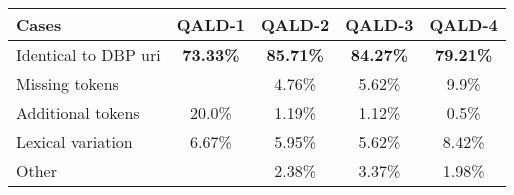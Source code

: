 {\centering
\begin{tabular}{l|c|c|c|c}
\textbf{Cases}  & \textbf{QALD-1} & \textbf{QALD-2} & \textbf{QALD-3} & \textbf{QALD-4} \\ \hline \hline
Identical to DBP uri   & \textbf{73.33\%}  & \textbf{85.71\%}  & \textbf{84.27\%}  & \textbf{79.21\%}  \\ \hline
Missing tokens         &                   & 4.76\%            & 5.62\%            & 9.9\%             \\ \hline
Additional tokens      & 20.0\%            & 1.19\%            & 1.12\%            & 0.5\%             \\ \hline
Lexical variation      & 6.67\%            & 5.95\%            & 5.62\%            & 8.42\%            \\ \hline
Other                  &                   & 2.38\%            & 3.37\%            & 1.98\%            \\ \hline
\end{tabular}
}
